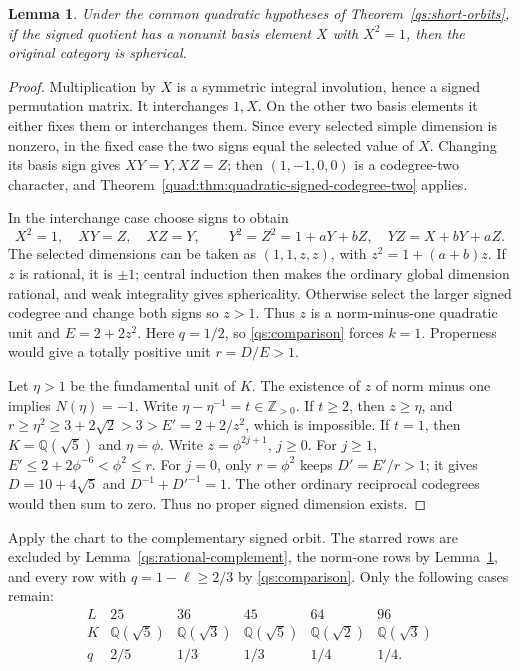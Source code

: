 \documentclass[11pt,a4paper]{article}
\newtheorem{lemma}[theorem]{Lemma}
\theoremstyle{definition}\newtheorem{definition}[theorem]{Definition}
\theoremstyle{remark}\newtheorem{remark}[theorem]{Remark}
\newcommand{\Q}{\mathbb Q}
\newcommand{\ZZ}{\mathbb Z}
\numberwithin{equation}{section}
\begin{document}
\begin{lemma}\label{qs:signed-involution}
Under the common quadratic hypotheses of Theorem~\ref{qs:short-orbits},
if the signed quotient has a nonunit basis element $X$ with $X^2=1$,
then the original category is spherical.
\end{lemma}
\begin{proof}
Multiplication by $X$ is a symmetric integral involution, hence a signed
permutation matrix. It interchanges $1,X$. On the other two basis
elements it either fixes them or interchanges them. Since every selected
simple dimension is nonzero, in the fixed case the two signs equal the
selected value of $X$. Changing its basis sign gives $XY=Y,XZ=Z$;
then $(1,-1,0,0)$ is a codegree-two character, and
Theorem~\ref{quad:thm:quadratic-signed-codegree-two} applies.

In the interchange case choose signs to obtain
\[
 X^2=1,\quad XY=Z,\quad XZ=Y,\qquad
 Y^2=Z^2=1+aY+bZ,\quad YZ=X+bY+aZ.
\]
The selected dimensions can be taken as $(1,1,z,z)$, with
$z^2=1+(a+b)z$. If $z$ is rational, it is $\pm1$; central induction
then makes the ordinary global dimension rational, and weak integrality
gives sphericality. Otherwise select the larger signed codegree and
change both signs so $z>1$. Thus $z$ is a norm-minus-one quadratic
unit and $E=2+2z^2$. Here $q=1/2$, so \eqref{qs:comparison} forces
$k=1$. Properness would give a totally positive unit $r=D/E>1$.

Let $\eta>1$ be the fundamental unit of $K$. The existence of $z$
of norm minus one implies $N(\eta)=-1$. Write
$\eta-\eta^{-1}=t\in\ZZ_{>0}$. If $t\ge2$, then $z\ge\eta$, and
$r\ge\eta^2\ge3+2\sqrt2>3>E'=2+2/z^2$, which is impossible.
If $t=1$, then $K=\Q(\sqrt5)$ and $\eta=\phi$.
Write $z=\phi^{2j+1}$, $j\ge0$. For $j\ge1$,
$E'\le2+2\phi^{-6}<\phi^2\le r$. For $j=0$, only
$r=\phi^2$ keeps $D'=E'/r>1$; it gives $D=10+4\sqrt5$ and
$D^{-1}+D'^{-1}=1$. The other ordinary reciprocal codegrees would
then sum to zero. Thus no proper signed dimension exists.
\end{proof}

Apply the chart to the complementary signed orbit. The starred rows
are excluded by Lemma~\ref{qs:rational-complement}, the norm-one rows
by Lemma~\ref{qs:signed-involution}, and every row with
$q=1-\ell\ge2/3$ by \eqref{qs:comparison}. Only the following cases remain:
\begin{equation}\label{qs:five-cases}
\begin{array}{c|ccccc}
L&25&36&45&64&96\\\hline
K&\Q(\sqrt5)&\Q(\sqrt3)&\Q(\sqrt5)&
\Q(\sqrt2)&\Q(\sqrt3)\\
q&2/5&1/3&1/3&1/4&1/4.
\end{array}
\end{equation}
\end{document}
